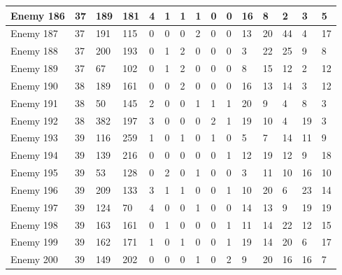 \begin{sidewaystable}[!h]
{\begin{tabular}{|l|l|l|l|l|l|l|l|l|l|l|l|l|l|l|}
			Enemy 186 & 37 & 189 & 181 & 4 & 1 & 1 & 1 & 0 & 0 & 16 & 8 & 2 & 3 & 5 \\ \hline
			Enemy 187 & 37 & 191 & 115 & 0 & 0 & 0 & 2 & 0 & 0 & 13 & 20 & 44 & 4 & 17 \\ \hline
			Enemy 188 & 37 & 200 & 193 & 0 & 1 & 2 & 0 & 0 & 0 & 3 & 22 & 25 & 9 & 8 \\ \hline
			Enemy 189 & 37 & 67 & 102 & 0 & 1 & 2 & 0 & 0 & 0 & 8 & 15 & 12 & 2 & 12 \\ \hline
			Enemy 190 & 38 & 189 & 161 & 0 & 0 & 2 & 0 & 0 & 0 & 16 & 13 & 14 & 3 & 12 \\ \hline
			Enemy 191 & 38 & 50 & 145 & 2 & 0 & 0 & 1 & 1 & 1 & 20 & 9 & 4 & 8 & 3 \\ \hline
			Enemy 192 & 38 & 382 & 197 & 3 & 0 & 0 & 0 & 2 & 1 & 19 & 10 & 4 & 19 & 3 \\ \hline
			Enemy 193 & 39 & 116 & 259 & 1 & 0 & 1 & 0 & 1 & 0 & 5 & 7 & 14 & 11 & 9 \\ \hline
			Enemy 194 & 39 & 139 & 216 & 0 & 0 & 0 & 0 & 0 & 1 & 12 & 19 & 12 & 9 & 18 \\ \hline
			Enemy 195 & 39 & 53 & 128 & 0 & 2 & 0 & 1 & 0 & 0 & 3 & 11 & 10 & 16 & 10 \\ \hline
			Enemy 196 & 39 & 209 & 133 & 3 & 1 & 1 & 0 & 0 & 1 & 10 & 20 & 6 & 23 & 14 \\ \hline
			Enemy 197 & 39 & 124 & 70 & 4 & 0 & 0 & 1 & 0 & 0 & 14 & 13 & 9 & 19 & 19 \\ \hline
			Enemy 198 & 39 & 163 & 161 & 0 & 1 & 0 & 0 & 0 & 1 & 11 & 14 & 22 & 12 & 15 \\ \hline
			Enemy 199 & 39 & 162 & 171 & 1 & 0 & 1 & 0 & 0 & 1 & 19 & 14 & 20 & 6 & 17 \\ \hline
			Enemy 200 & 39 & 149 & 202 & 0 & 0 & 0 & 1 & 0 & 2 & 9 & 20 & 16 & 16 & 7 \\ \hline
		\end{tabular}%
	}
\end{sidewaystable}
\clearpage


